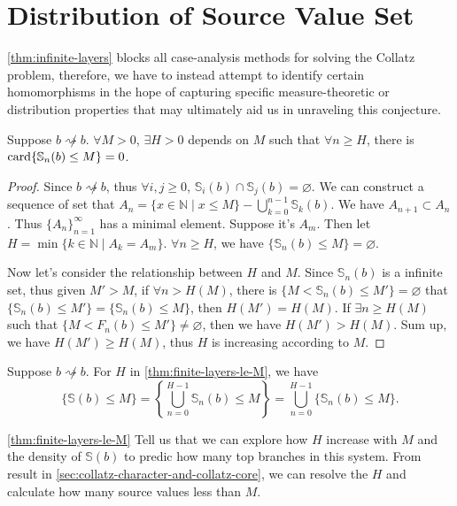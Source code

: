 \section{Distribution of Source Value Set}\label{sec:distribution-of-source-value-set}

\cref{thm:infinite-layers} blocks all case-analysis methods for solving the Collatz problem, therefore, we have to instead attempt to identify certain homomorphisms in the hope of capturing specific measure-theoretic or distribution properties that may ultimately aid us in unraveling this conjecture.

\begin{theorem}\label{thm:finite-layers-le-M}
	Suppose $b\not\rightsquigarrow b$.
	$\forall M > 0$, $\exists H > 0$ depends on $M$ such that $\forall n \ge H$, there is $\operatorname*{card}\{ \mathbb{S}_{n}(b)\le M \} = 0$.
\end{theorem}
\begin{proof}
	Since $b\not\rightsquigarrow b$, thus $\forall i, j \ge 0$, $\mathbb{S}_{i}(b)\cap \mathbb{S}_{j}(b) = \varnothing$.
	We can construct a sequence of set that $A_{n} = \{x\in\mathbb{N} \mid x \le M\} - \bigcup_{k=0}^{n-1}\mathbb{S}_{k}(b)$. We have $A_{n+1} \subset A_{n}$. Thus $\{A_n\}_{n=1}^{\infty}$ has a minimal element. Suppose it's $A_m$. Then let $ H = \min\{k\in\mathbb{N}\mid A_{k} = A_{m}\}$. $\forall n\ge H$, we have $\{\mathbb{S}_{n}(b)\le M\} = \varnothing$.

	Now let's consider the relationship between $H$ and $M$. Since $\mathbb{S}_{n}(b)$ is a infinite set, thus given $ M' > M$, if $\forall n > H(M)$, there is $\{M < \mathbb{S}_{n}(b) \le M' \} = \varnothing$ that $\{\mathbb{S}_{n}(b)\le M'\} = \{\mathbb{S}_{n}(b)\le M\}$, then $H(M') = H(M)$. If $\exists n\ge H(M)$ such that $\{M < F_{n}(b) \le M' \} \ne \varnothing$, then we have $H(M') > H(M)$. Sum up, we have $H(M') \ge H(M)$, thus $H$ is increasing according to $M$.
\end{proof}
\begin{corollary}\label{cor:source-value-set-finite-decomposition}
	Suppose $b\not\rightsquigarrow b$. For $H$ in \cref{thm:finite-layers-le-M}, we have
	\[ \{\mathbb{S}(b) \le M\} =  \left\{\bigcup_{n=0}^{H-1}\mathbb{S}_{n}(b)\le M\right\} = \bigcup_{n=0}^{H-1}\{\mathbb{S}_{n}(b) \le M\}. \]
\end{corollary}
\cref{thm:finite-layers-le-M} Tell us that we can explore how $H$ increase with $M$ and the density of $\mathbb{S}(b)$ to predic how many top branches in this system. From result in \cref{sec:collatz-character-and-collatz-core}, we can resolve the $H$ and calculate how many source values less than $M$.

